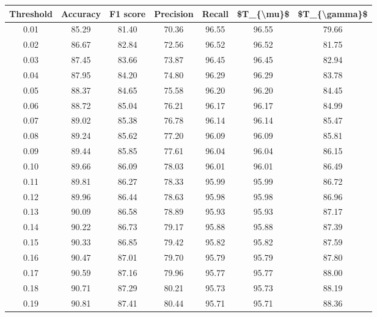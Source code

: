 \begin{tabular}{|c|c|c|c|c|c|c|}
\hline
 Threshold &  Accuracy &  F1 score &  Precision &  Recall &  \$T\_\{\textbackslash mu\}\$ &  \$T\_\{\textbackslash gamma\}\$ \\
\hline
      0.01 &     85.29 &     81.40 &      70.36 &   96.55 &      96.55 &         79.66 \\
      0.02 &     86.67 &     82.84 &      72.56 &   96.52 &      96.52 &         81.75 \\
      0.03 &     87.45 &     83.66 &      73.87 &   96.45 &      96.45 &         82.94 \\
      0.04 &     87.95 &     84.20 &      74.80 &   96.29 &      96.29 &         83.78 \\
      0.05 &     88.37 &     84.65 &      75.58 &   96.20 &      96.20 &         84.45 \\
      0.06 &     88.72 &     85.04 &      76.21 &   96.17 &      96.17 &         84.99 \\
      0.07 &     89.02 &     85.38 &      76.78 &   96.14 &      96.14 &         85.47 \\
      0.08 &     89.24 &     85.62 &      77.20 &   96.09 &      96.09 &         85.81 \\
      0.09 &     89.44 &     85.85 &      77.61 &   96.04 &      96.04 &         86.15 \\
      0.10 &     89.66 &     86.09 &      78.03 &   96.01 &      96.01 &         86.49 \\
      0.11 &     89.81 &     86.27 &      78.33 &   95.99 &      95.99 &         86.72 \\
      0.12 &     89.96 &     86.44 &      78.63 &   95.98 &      95.98 &         86.96 \\
      0.13 &     90.09 &     86.58 &      78.89 &   95.93 &      95.93 &         87.17 \\
      0.14 &     90.22 &     86.73 &      79.17 &   95.88 &      95.88 &         87.39 \\
      0.15 &     90.33 &     86.85 &      79.42 &   95.82 &      95.82 &         87.59 \\
      0.16 &     90.47 &     87.01 &      79.70 &   95.79 &      95.79 &         87.80 \\
      0.17 &     90.59 &     87.16 &      79.96 &   95.77 &      95.77 &         88.00 \\
      0.18 &     90.71 &     87.29 &      80.21 &   95.73 &      95.73 &         88.19 \\
      0.19 &     90.81 &     87.41 &      80.44 &   95.71 &      95.71 &         88.36 \\

\end{tabular}

